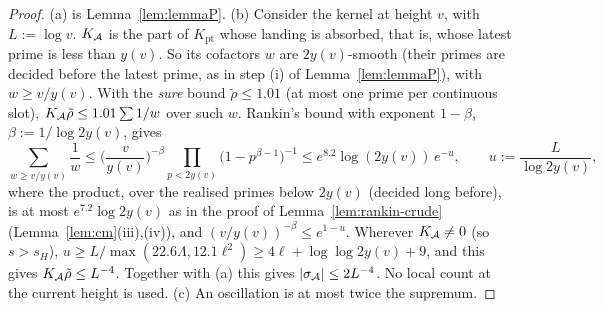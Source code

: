 \begin{proof}
(a) is Lemma~\ref{lem:lemmaP}. (b) Consider the kernel at height $v$, with $L:=\log v$. $K_{\mathcal{A}}$ is the part of
$K_{\mathrm{pt}}$ whose landing is absorbed, that is, whose latest prime is less than $y(v)$. So its cofactors $w$ are
$2y(v)$-smooth (their primes are decided before the latest prime, as in step (i) of Lemma~\ref{lem:lemmaP}), with
$w\ge v/y(v)$. With the \emph{sure} bound $\tilde\rho\le1.01$ (at most one prime per continuous slot),
$K_{\mathcal{A}}\tilde\rho\le1.01\sum1/w$ over such $w$. Rankin's bound with exponent $1-\beta$, $\beta:=1/\log2y(v)$, gives
\[
\sum_{w\ge v/y(v)}\frac1w\le\Big(\frac v{y(v)}\Big)^{-\beta}\prod_{p<2y(v)}\big(1-p^{\beta-1}\big)^{-1}\le e^{8.2}\log(2y(v))\,e^{-u},
\qquad u:=\frac L{\log2y(v)},
\]
where the product, over the realised primes below $2y(v)$ (decided long before), is at most $e^{7.2}\log2y(v)$ as in the
proof of Lemma~\ref{lem:rankin-crude} (Lemma~\ref{lem:cm}(iii),(iv)), and $(v/y(v))^{-\beta}\le e^{1-u}$. Wherever $K_{\mathcal{A}}\ne0$ (so $s>s_H$),
$u\ge L/\max(22.6\Lambda,12.1\ell^2)\ge4\ell+\log\log2y(v)+9$, and this gives $K_{\mathcal{A}}\tilde\rho\le L^{-4}$.
Together with (a) this gives $|\sigma_{\mathcal{A}}|\le2L^{-4}$. No local count at the current height is
used. (c) An oscillation is at most twice the supremum.
\end{proof}

